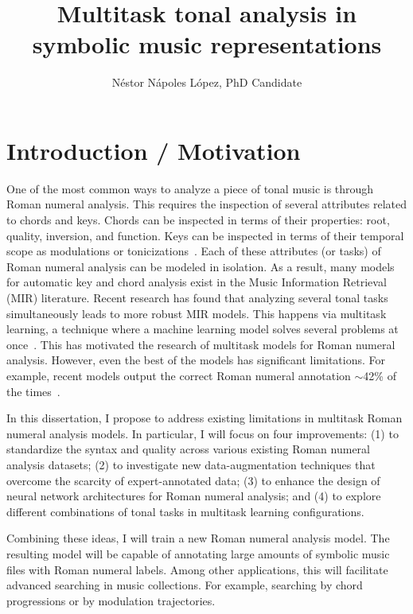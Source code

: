 \documentclass[12pt]{article}
\title{Multitask tonal analysis in symbolic music representations}
\author{N\'estor N\'apoles L\'opez, PhD Candidate}
\date{}
\newcommand{\guide}[1]{}
\begin{document}
\maketitle

\section*{Introduction / Motivation}

\guide{Problem}
One of the most common ways to analyze a piece of tonal music is through Roman numeral analysis.
This requires the inspection of several attributes related to chords and keys.
Chords can be inspected in terms of their properties: root, quality, inversion, and function.
Keys can be inspected in terms of their temporal scope as modulations or tonicizations~\cite{napoleslopez2020local}.
Each of these attributes (or tasks) of Roman numeral analysis can be modeled in isolation.
As a result, many models for automatic key and chord analysis exist in the Music Information Retrieval (MIR) literature.
Recent research has found that analyzing several tonal tasks simultaneously leads to more robust MIR models.
This happens via multitask learning, a technique where a machine learning model solves several problems at once~\cite{ruder2017overview}.
This has motivated the research of multitask models for Roman numeral analysis.
However, even the best of the models has significant limitations.
For example, recent models output the correct Roman numeral annotation $\sim$42\% of the times~\cite{chen2021attend, micchi2020not}.

\guide{Proposal}
In this dissertation, I propose to address existing limitations in multitask Roman numeral analysis models.
In particular, I will focus on four improvements:
(1) to standardize the syntax and quality across various existing Roman numeral analysis datasets;
(2) to investigate new data-augmentation techniques that overcome the scarcity of expert-annotated data;
(3) to enhance the design of neural network architectures for Roman numeral analysis;
and (4) to explore different combinations of tonal tasks in multitask learning configurations.

Combining these ideas, I will train a new Roman numeral analysis model.
The resulting model will be capable of annotating large amounts of symbolic music files with Roman numeral labels.
Among other applications, this will facilitate advanced searching in music collections.
For example, searching by chord progressions or by modulation trajectories.
\end{document}
